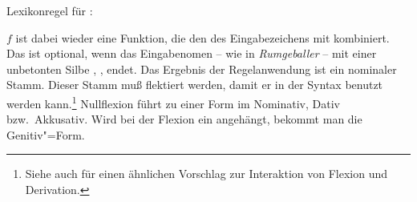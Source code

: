 \eas
Lexikonregel für \geenen:\\
\label{lr-gee-nom}%
\zs

\noindent
$f$ ist dabei wieder eine Funktion, die den \phonw des Eingabezeichens
mit \gee kombiniert. 
Das  ist optional, wenn das Eingabenomen -- wie \zb in \emph{Rumgeballer} --
mit einer unbetonten Silbe , ,  endet.
Das Ergebnis der Regelanwendung ist ein nominaler Stamm. Dieser Stamm
muß flektiert werden, damit er in der Syntax benutzt werden kann.\footnote{
        Siehe auch \citet[]{Koenig99a} für einen
        ähnlichen Vorschlag zur Interaktion von Flexion und Derivation.%
}
Nullflexion führt zu einer Form
im Nominativ, Dativ bzw.\ Akkusativ. Wird bei der Flexion ein  angehängt,
bekommt man die Genitiv"=Form.

